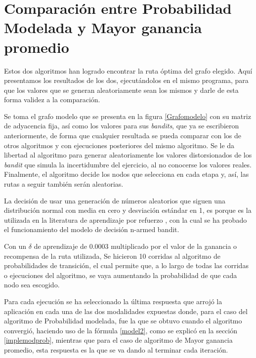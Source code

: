 \section{Comparación entre Probabilidad Modelada y Mayor ganancia promedio} 

Estos dos algoritmos han logrado encontrar la ruta óptima del grafo elegido. Aquí presentamos los resultados de los dos, ejecutándolos en el mismo programa, para que los valores que se generan aleatoriamente sean los mismos y darle de esta forma validez a la comparación.

Se toma el grafo modelo que se presenta en la figura \ref{Grafomodelo} con su matriz de adyacencia fija, así como los valores para sus \textit{bandits}, que ya se escribieron anteriormente, de forma que cualquier resultada se pueda comparar con los de otros algoritmos y con ejecuciones posteriores del mismo algoritmo. Se le da libertad al algoritmo para generar aleatoriamente los valores distorsionados de los \textit{bandit} que simula la incertidumbre del ejercicio, al no conocerse los valores reales. Finalmente, el algoritmo decide los nodos que selecciona en cada etapa y, así, las rutas a seguir también serán aleatorias.

La decisión de usar una generación de números aleatorios que siguen una distribución normal con media en cero y desviación estándar en 1, es porque es la utilizada en la literatura de aprendizaje por refuerzo \citep{sutton1992reinforcement}, con la cual se ha probado el funcionamiento del modelo de decisión n-armed bandit. 


Con un $\delta$ de aprendizaje de 0.0003 multiplicado por el valor de la ganancia o recompensa de la ruta utilizada, Se hicieron 10 corridas al algoritmo de probabilidades de transición, el cual permite que, a lo largo de todas las corridas o ejecuciones del algoritmo, se vaya aumentando la probabilidad de que cada nodo sea escogido.

Para cada ejecución se ha seleccionado la última respuesta que arrojó la aplicación en cada una de las dos modalidades expuestas donde, para el caso del algoritmo de Probabilidad modelada, fue la que se obtuvo cuando el algoritmo convergió, haciendo uso de la fórmula \ref{model2}, como se explicó en la sección \ref{implemodprob}, mientras que para el caso de algoritmo de Mayor ganancia promedio, esta respuesta es la que se va dando al terminar cada iteración. 


